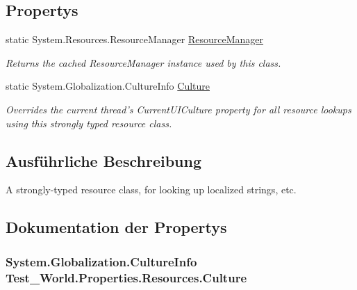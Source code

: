 \subsection*{Propertys}
\begin{DoxyCompactItemize}
\item 
static System.Resources.ResourceManager \hyperlink{class_test___world_1_1_properties_1_1_resources_a53b3f19f3590b7cf48b3bfbf1a343023}{ResourceManager}
\begin{DoxyCompactList}\small\item\em Returns the cached ResourceManager instance used by this class. \item\end{DoxyCompactList}\item 
static System.Globalization.CultureInfo \hyperlink{class_test___world_1_1_properties_1_1_resources_acb099bdb9ba9fb469c66df36ce63bd25}{Culture}
\begin{DoxyCompactList}\small\item\em Overrides the current thread's CurrentUICulture property for all resource lookups using this strongly typed resource class. \item\end{DoxyCompactList}\end{DoxyCompactItemize}


\subsection{Ausführliche Beschreibung}
A strongly-\/typed resource class, for looking up localized strings, etc. 

\subsection{Dokumentation der Propertys}
\hypertarget{class_test___world_1_1_properties_1_1_resources_acb099bdb9ba9fb469c66df36ce63bd25}{
\subsubsection[{Culture}]{\setlength{\rightskip}{0pt plus 5cm}System.Globalization.CultureInfo Test\_\-World.Properties.Resources.Culture}}
\label{class_test___world_1_1_properties_1_1_resources_acb099bdb9ba9fb469c66df36ce63bd25}


